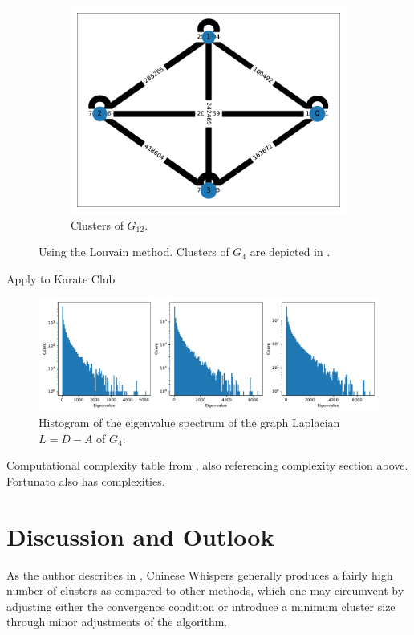 \documentclass[12pt, a4paper]{article}
\begin{document}
\begin{figure}
\begin{subfigure}[b]{0.3\textwidth}
      \includegraphics[width=\textwidth]{figures/H-12-louvain.pdf}
      \caption{Clusters of $G_{12}$.}
      \label{fig:h-12}
    \end{subfigure}
    \caption{Using the Louvain method. Clusters of $G_4$ are depicted in .}
    \label{fig:three graphs}
  \end{figure}

  Apply to Karate Club

  \begin{figure}[H]
    \centering
    \includegraphics[width=\linewidth]{figures/spectrum-of-laplacian.pdf}
    \caption{Histogram of the eigenvalue spectrum of the graph Laplacian $L = D - A$ of $G_4$.}
  \end{figure}

  Computational complexity table from \cite{watset}, also referencing complexity section above. Fortunato also has complexities.

  \pagebreak
  \section{Discussion and Outlook}
  As the author describes in \cite{cw-biemann}, Chinese Whispers generally produces a fairly high number of clusters as compared to other methods, which one may circumvent by adjusting either the convergence condition or introduce a minimum cluster size through minor adjustments of the algorithm.

  \pagebreak
  \printbibliography
\end{document}
